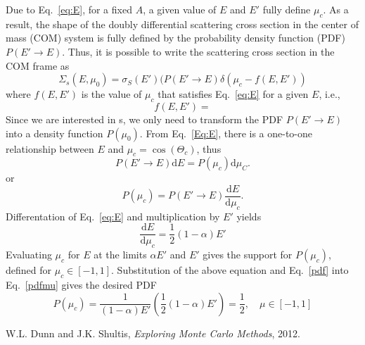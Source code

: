 \documentclass[12pt]{article}
\renewcommand{\d}{\mathrm{d}}
\newcommand{\ra}{\rightarrow}
\newenvironment{solution}[1][Solution]{\begin{trivlist}
\item[\hskip \labelsep {\bfseries #1} {\hspace{-0.2em}\bfseries:}]\hspace{0.3in}\newline}{\end{trivlist}}
\begin{document}
\begin{solution}
Due to Eq.~\eqref{eq:E}, for a fixed $A$, a given value of $E$ and $E'$ fully define
$\mu_c$. As a result, the shape of the doubly differential scattering cross section
 in the center of mass (COM) system is fully defined by the probability density function (PDF) $P(E'\ra E)$. Thus, it is
possible to write the scattering cross section in the COM frame as~\cite{dunnshultis}
\begin{equation}
    \Sigma_s(E,\mu_0) = \sigma_S(E')(P(E' \ra E) \delta(\mu_c - f(E,E'))
 \end{equation}
 where $f(E,E')$ is the value of $\mu_c$ that satisfies Eq.~\eqref{eq:E} for a given
 $E$, i.e.,
 \begin{equation}
     f(E,E') = 
 \end{equation}
 Since we are interested in s, we only need to transform the PDF $P(E'\ra E)$ into a density function
 $P(\mu_0)$. From Eq.~\eqref{Eq:E},
 there is a one-to-one relationship between $E$ and $\mu_c=\cos(\Theta_c)$, thus 
 \begin{equation}
  P(E'\ra E) \d E = P(\mu_c)\d \mu_C.
 \end{equation}
 or
 \begin{equation} \label{pdfmu}
  P(\mu_c) = P(E' \ra E) \frac{\d E}{\d \mu_c}.
 \end{equation}
 Differentation of Eq.~\eqref{eq:E} and multiplication by $E'$ yields
 \begin{equation}
     \frac{ \d E}{\d \mu_c} = \frac{1}{2}(1-\alpha) E'
 \end{equation}
 Evaluating $\mu_c$ for $E$ at the limits $\alpha E'$
 and $E'$ gives the support for $P(\mu_c)$, defined for $\mu_c \in[ -1,1 ]$.  
 Substitution of the above equation and Eq.~\eqref{pdf} into Eq.~\eqref{pdfmu} gives
 the desired PDF
 \begin{equation}
     P(\mu_c) = \frac{1}{(1-\alpha)E'} \left( \frac{1}{2}(1-\alpha)E' \right) =
     \frac{1}{2}, \quad \mu \in [-1,1]
 \end{equation}
 




 \end{solution}

 \begin{thebibliography}{9}

         W.L. Dunn and J.K. Shultis, \emph{Exploring Monte Carlo Methods}, 2012.


\end{thebibliography}
\end{document}
